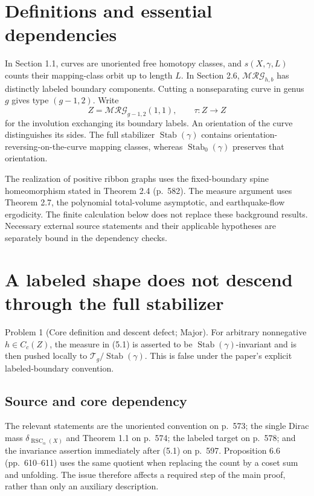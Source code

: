 \documentclass[10pt]{article}
\begin{document}
\section*{Definitions and essential dependencies}
In Section 1.1, curves are unoriented free homotopy classes, and \(s(X,\gamma,L)\) counts their mapping-class orbit up to length \(L\). In Section 2.6, \(\mathcal{MRG}_{h,b}\) has distinctly labeled boundary components. Cutting a nonseparating curve in genus \(g\) gives type \((g-1,2)\). Write \[Z=\mathcal{MRG}_{g-1,2}(1,1),\qquad \tau:Z\longrightarrow Z\] for the involution exchanging its boundary labels. An orientation of the curve distinguishes its sides. The full stabilizer \(\operatorname{Stab}(\gamma)\) contains orientation-reversing-on-the-curve mapping classes, whereas \(\operatorname{Stab}_0(\gamma)\) preserves that orientation.\par
The realization of positive ribbon graphs uses the fixed-boundary spine homeomorphism stated in Theorem 2.4 (p. 582). The measure argument uses Theorem 2.7, the polynomial total-volume asymptotic, and earthquake-flow ergodicity. The finite calculation below does not replace these background results. Necessary external source statements and their applicable hypotheses are separately bound in the dependency checks.\par
\section*{A labeled shape does not descend through the full stabilizer}
Problem 1 (Core definition and descent defect; Major).  For arbitrary nonnegative \(h\in C_c(Z)\), the measure in (5.1) is asserted to be \(\operatorname{Stab}(\gamma)\)-invariant and is then pushed locally to \(\mathcal T_g/\operatorname{Stab}(\gamma)\). This is false under the paper’s explicit labeled-boundary convention.\par
\subsection*{Source and core dependency}
The relevant statements are the unoriented convention on p. 573; the single Dirac mass \(\delta_{\operatorname{RSC}_\alpha(X)}\) and Theorem 1.1 on p. 574; the labeled target on p. 578; and the invariance assertion immediately after (5.1) on p. 597. Proposition 6.6 (pp. 610–611) uses the same quotient when replacing the count by a coset sum and unfolding. The issue therefore affects a required step of the main proof, rather than only an auxiliary description.\par
\end{document}
